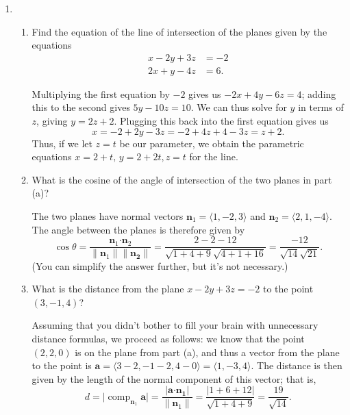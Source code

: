 \documentclass[12pt]{article}
\newcommand{\points}[1]{\marginpar{\hspace{24pt}[#1]}}
\newcommand{\aaa}{\mathbf{a}}
\newcommand{\dotp}{\boldsymbol{\cdot}}
\newcommand{\abs}[1]{\lvert #1\rvert}
\newcommand{\len}[1]{\lVert #1\rVert}
\DeclareMathOperator{\comp}{comp}
\begin{document}
\begin{enumerate}
\newpage

\item \begin{enumerate}
\item Find the equation of the line of intersection of the planes given by the equations \points{8}
\begin{align*}
x - 2y + 3z & = -2\\
2x + y - 4z & = 6.
\end{align*}


\bigskip

Multiplying the first equation by $-2$ gives us $-2x+4y-6z=4$; adding this to the second gives $5y-10z=10$. We can thus solve for $y$ in terms of $z$, giving $y=2z+2$. Plugging this back into the first equation gives us
\[
x = -2+2y-3z = -2 +4z+4-3z = z+2.
\]
Thus, if we let $z=t$ be our parameter, we obtain the parametric equations $x=2+t,\,y=2+2t,z=t$ for the line.

\vspace{1in}

\item What is the cosine of the angle of intersection of the two planes in part (a)? \points{2}

\bigskip

The two planes have normal vectors $\mathbf{n}_1 = \langle 1,-2,3\rangle$ and $\mathbf{n}_2 = \langle 2,1,-4\rangle$. The angle between the planes is therefore given by
\[
\cos\theta = \frac{\mathbf{n}_1\dotp\mathbf{n}_2}{\len{\mathbf{n}_1}\len{\mathbf{n_2}}} = \frac{2-2-12}{\sqrt{1+4+9}\sqrt{4+1+16}} = \frac{-12}{\sqrt{14}\sqrt{21}}.
\]
(You can simplify the answer further, but it's not necessary.)

\bigskip

\item What is the distance from the plane $x-2y+3z=-2$ to the point $(3,-1,4)$? \points{3}

\bigskip

Assuming that you didn't bother to fill your brain with unnecessary distance formulas, we proceed as follows: we know that the point $(2,2,0)$ is on the plane from part (a), and thus a vector from the plane to the point is $\aaa = \langle 3-2, -1-2, 4-0\rangle =\langle 1, -3, 4\rangle$. The distance is then given by the length of the normal component of this vector; that is,
\[
d = \abs{\comp_{\mathbf{n}_1}\aaa} = \frac{\abs{\aaa\dotp\mathbf{n_1}}}{\len{\mathbf{n}_1}} = \frac{\abs{1+6+12}}{\sqrt{1+4+9}}=\frac{19}{\sqrt{14}}.
\]

\bigskip
\end{enumerate}


\end{enumerate}
\end{document}

